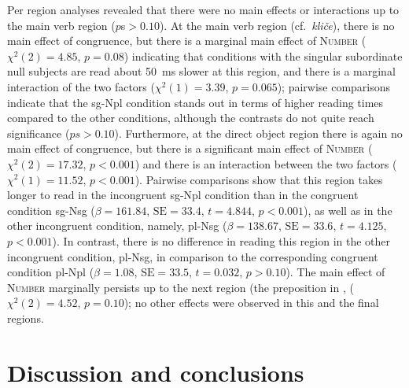 \documentclass[output=paper,colorlinks,citecolor=brown]{langscibook}
\begin{document}
Per region analyses revealed that there were no main effects or interactions up to the main verb region ($p$s${}>0.10$). At the main verb region (cf.\ \textit{kliče}), there is no main effect of congruence, but there is a marginal main effect of \textsc{Number} ($\chi^2(2)=4.85$, $p=0.08$) indicating that conditions with the singular subordinate null subjects are read about \qty{50}{ms} slower at this region, and there is a marginal interaction of the two factors ($\chi^2(1)=3.39$, $p=0.065$); pairwise comparisons indicate that the sg-Npl condition stands out in terms of higher reading times compared to the other conditions, although the contrasts do not quite reach significance ($ps>0.10$). Furthermore, at the direct object region there is again no main effect of congruence, but there is a significant main effect of \textsc{Number} ($\chi^2(2)=17.32$, $p<0.001$) and there is an interaction between the two factors ($\chi^2(1)=11.52$, $p<0.001$). Pairwise comparisons show that this region takes longer to read in the incongruent sg-Npl condition than in the congruent condition sg-Nsg ($β=161.84$, $\text{SE}=33.4$, $t=4.844$, $p<0.001$), as well as in the other incongruent condition, namely, pl-Nsg ($β=138.67$, $\text{SE}=33.6$, $t=4.125$, $p<0.001$). In contrast, there is no difference in reading this region in the other incongruent condition, pl-Nsg, in comparison to the corresponding congruent condition pl-Npl ($β=1.08$, $\text{SE}=33.5$, $t=0.032$, $p>0.10$). The main effect of \textsc{Number} marginally persists up to the next region (the preposition in , ($\chi^2(2)=4.52$, $p=0.10$); no other effects were observed in this and the final regions.

\section{Discussion and conclusions}\label{ste-pav:sec:discussion-conclusions}\largerpage
\end{document}
